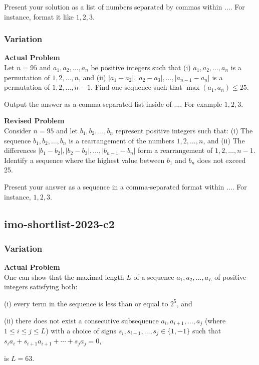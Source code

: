 Present your solution as a list of numbers separated by commas within $\boxed{...}$. For instance, format it like $\boxed{1, 2, 3}$.

\subsubsection{Variation}
\textbf{Actual Problem}\\
Let $n = 95$ and $a_1, a_2, \ldots, a_n$ be positive integers such that
(i) $a_1, a_2, \ldots, a_n$ is a permutation of $1, 2, \ldots, n$, and
(ii) $|a_1 - a_2|, |a_2 - a_3|, \ldots, |a_{n-1} - a_{n}|$ is a permutation of $1, 2, \ldots, {n-1}$.
Find one sequence such that $\max(a_1, a_n) \leq 25$.

Output the answer as a comma separated list inside of $\boxed{...}$. For example $\boxed{1, 2, 3}$.

\textbf{Revised Problem}\\
Consider $n = 95$ and let $b_1, b_2, \ldots, b_n$ represent positive integers such that:
(i) The sequence $b_1, b_2, \ldots, b_n$ is a rearrangement of the numbers $1, 2, \ldots, n$, and
(ii) The differences $|b_1 - b_2|, |b_2 - b_3|, \ldots, |b_{n-1} - b_{n}|$ form a rearrangement of $1, 2, \ldots, n-1$.
Identify a sequence where the highest value between $b_1$ and $b_n$ does not exceed 25.

Present your answer as a sequence in a comma-separated format within $\boxed{...}$. For instance, $\boxed{1, 2, 3}$.

\subsection{imo-shortlist-2023-c2}
\subsubsection{Variation}
\textbf{Actual Problem}\\
One can show that the maximal length $L$ of a sequence $a_1, a_2, \ldots, a_L$ of positive integers satisfying both:

(i) every term in the sequence is less than or equal to $2^5$, and

(ii) there does not exist a consecutive subsequence $a_i, a_{i+1}, \ldots, a_{j}$ (where $1 \leq i \leq j \leq L$) with
a choice of signs $s_i, s_{i+1}, \ldots, s_{j} \in \{1, -1\}$ such that $s_i a_i + s_{i+1} a_{i+1} + \cdots + s_{j} a_{j} = 0$,

is $L = 63$.

